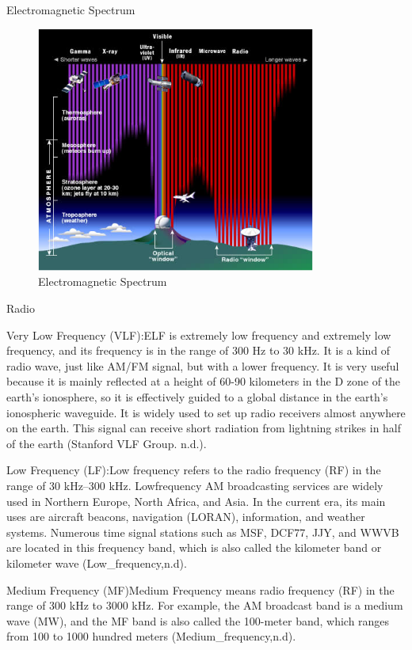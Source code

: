 \documentclass[conference]{IEEEtran}
\newcommand{\subparagraph}{}
\begin{document}
\subparagraph{Electromagnetic Spectrum} 

\begin{figure}[htbp]
    \centerline{\includegraphics[width=260pt]{images/1.2.png}}
    \caption{Electromagnetic Spectrum}
    \label{Spectrum}
\end{figure}

\subparagraph{Radio}

Very Low Frequency (VLF):ELF is extremely low frequency and extremely low frequency, and its frequency is in the range of 
300 Hz to 30 kHz. It is a kind of radio wave, just like AM/FM signal, but with a lower frequency. It is very useful because 
it is mainly reflected at a height of 60-90 kilometers in the D zone of the earth's ionosphere, so it is effectively guided 
to a global distance in the earth's ionospheric waveguide. It is widely used to set up radio receivers almost anywhere on 
the earth. This signal can receive short radiation from lightning strikes in half of the earth (Stanford VLF Group. n.d.).

Low Frequency (LF):Low frequency refers to the radio frequency (RF) in the range of 30 kHz–300 kHz. Low\-frequency AM 
broadcasting services are widely used in Northern Europe, North Africa, and Asia. In the current era, its main uses are 
aircraft beacons, navigation (LORAN), information, and weather systems. Numerous time signal stations such as MSF, DCF77, 
JJY, and WWVB are located in this frequency band, which is also called the kilometer band or kilometer wave (Low\_frequency,n.d).

Medium Frequency (MF)\:Medium Frequency means radio frequency (RF) in the range of 300 kHz to 3000 kHz. For example, 
the AM broadcast band is a medium wave (MW), and the MF band is also called the 100-meter band, which ranges from 100 
to 1000 hundred meters (Medium\_frequency,n.d).
\end{document}
